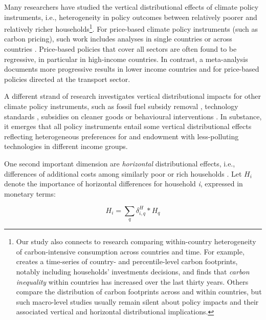 \documentclass[12pt, a4paper]{article}
\begin{document}
Many researchers have studied the vertical distributional effects of climate policy instruments, i.e., heterogeneity in policy outcomes between relatively poorer and relatively richer households\footnote{Our study also connects to research comparing within-country heterogeneity of carbon-intensive consumption across countries and time. For example, \textcite{Chancel.2022b} creates a time-series of country- and percentile-level carbon footprints, notably including households' investments decisions, and finds that \textit{carbon inequality} within countries has increased over the last thirty years. Others \autocite{Oswald.2020,Bruckner.2022} compare the distribution of carbon footprints across and within countries, but such macro-level studies usually remain silent about policy impacts and their associated vertical and horizontal distributional implications.}. For price-based climate policy instruments (such as carbon pricing), such work includes analyses in single countries \autocite{Poterba.1991,Goulder.2019,Grainger.2010,Rausch.2011,Garaffa.2021,Sterner.2012,Wu.2022} or across countries \autocite{Budolfson.2021,Feindt.2021,Dorband.2019,Steckel.2021b,VogtSchilb.2019,Missbach.2024}. Price-based policies that cover all sectors are often found to be regressive, in particular in high-income countries. In contrast, a meta-analysis \autocite{Ohlendorf.2021} documents more progressive results in lower income countries and for price-based policies directed at the transport sector.

A different strand of research investigates vertical distributional impacts for other climate policy instruments, such as fossil fuel subsidy removal \autocite{Schaffitzel.2019,Giuliano.2020,DelArzeGranado.2012}, technology standards \autocite{Levinson.2019,Zhao.2022,Bruegge.2019}, subsidies on cleaner goods \autocite{Borenstein.2016,Vaishnav.2017,Winter.2019} or behavioural interventions \autocite{DellaValle.2020,Liebe.2021}. In substance, it emerges that all policy instruments entail some vertical distributional effects reflecting heterogeneous preferences for and endowment with less-polluting technologies in different income groups. 

One second important dimension are \textit{horizontal} distributional effects, i.e., differences of additional costs among similarly poor or rich households \autocite{Rausch.2011,Fischer.2019}. Let $H_{i}$ denote the importance of horizontal differences for household \textit{i}, expressed in monetary terms:

\begin{equation}\label{eq_H}
    H_{i} = \sum_{q} \delta_{i,q}^{H} * H_{q}
\end{equation}
\end{document}
